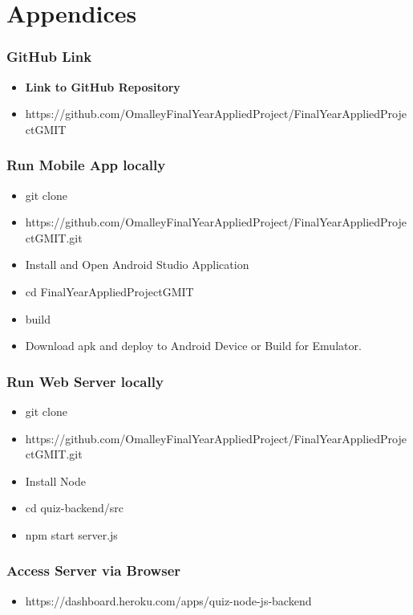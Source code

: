 \chapter{ Appendices}


\subsection{GitHub Link}

\begin{itemize}

\item \textbf{Link to GitHub Repository} 
\item https://github.com/OmalleyFinalYearAppliedProject/FinalYearAppliedProjectGMIT
\end{itemize}

\subsection{Run Mobile App locally}


\begin{itemize}
\item git clone 
\item https://github.com/OmalleyFinalYearAppliedProject/FinalYearAppliedProjectGMIT.git
\item Install and Open Android Studio Application
\item cd FinalYearAppliedProjectGMIT
\item build
\item Download apk and deploy to Android Device or Build for Emulator.
\end{itemize}

\subsection{Run Web Server locally}

\begin{itemize}

\item git clone 
\item https://github.com/OmalleyFinalYearAppliedProject/FinalYearAppliedProjectGMIT.git
\item Install Node
\item cd quiz-backend/src
\item  npm start server.js
\end{itemize}

\subsection{Access Server via Browser}
\begin{itemize}
\item https://dashboard.heroku.com/apps/quiz-node-js-backend
\end{itemize}
